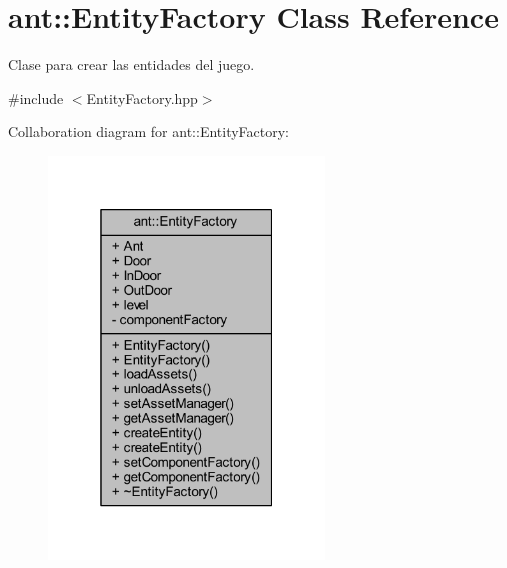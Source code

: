\hypertarget{classant_1_1_entity_factory}{\section{ant\+:\+:Entity\+Factory Class Reference}
\label{classant_1_1_entity_factory}
}


Clase para crear las entidades del juego.  




{\ttfamily \#include $<$Entity\+Factory.\+hpp$>$}



Collaboration diagram for ant\+:\+:Entity\+Factory\+:
\nopagebreak
\begin{figure}[H]
\begin{center}
\leavevmode
\includegraphics[width=208pt]{df/d9c/classant_1_1_entity_factory__coll__graph}
\end{center}
\end{figure}
